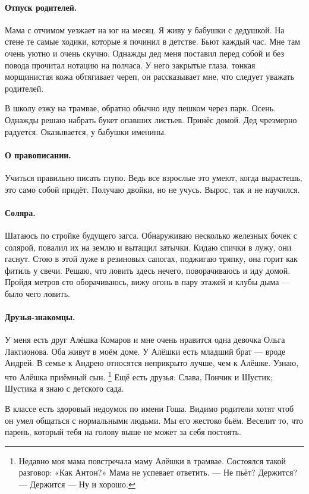 \documentclass{book}
\begin{document}
\paragraph{Отпуск родителей.} 
Мама с отчимом уезжает на юг на месяц.
Я живу у бабушки с дедушкой.
На стене те самые ходики, которые я починил в детстве.
Бьют каждый час.
Мне там очень уютно и очень скучно.
Однажды дед меня поставил перед собой и без повода прочитал нотацию на полчаса.
У него закрытые глаза,
тонкая морщинистая кожа обтягивает череп, 
он рассказывает мне, что следует уважать родителей.

В школу езжу на трамвае, обратно обычно иду пешком через парк.
Осень.
Однажды решаю набрать букет опавших листьев.
Принёс домой. 
Дед чрезмерно радуется. 
Оказывается, у бабушки именины.

\paragraph{О правописании.}
Учиться правильно писать глупо. 
Ведь все взрослые это умеют,
когда вырастешь, это само собой придёт.
Получаю двойки, но не учусь. 
Вырос, так и не научился.

\paragraph{Соляра.}
Шатаюсь по стройке будущего загса.
Обнаруживаю несколько железных бочек с солярой,
повалил их на землю и вытащил затычки.
Кидаю спички в лужу, они гаснут.
Стою в этой луже в резиновых сапогах,
поджигаю тряпку, она горит как фитиль у свечи.
Решаю, что ловить здесь нечего, поворачиваюсь и иду домой.
Пройдя метров сто оборачиваюсь, вижу огонь в пару этажей и клубы дыма --- было чего ловить.

\paragraph{Друзья-знакомцы.}
У меня есть друг Алёшка Комаров
и мне очень нравится одна девочка Ольга Лактионова.
Оба живут в моём доме.
У Алёшки есть младший брат --- вроде Андрей.
В семье к Андрею относятся неприкрыто лучше, чем к Алёшке.
Узнаю, что Алёшка приёмный сын.%
\footnote{Недавно моя мама повстречала маму Алёшки в трамвае. Состоялся такой разговор: «Как Антон?» Мама не успевает ответить. --- Не пьёт? Держится? --- Держится --- Ну и хорошо.}
Ещё есть друзья: Слава, Пончик и Шустик;
Шустика я знаю с детского сада.

В классе есть здоровый недоумок по имени Гоша.
Видимо родители хотят чтоб он умел общаться с нормальными людьми.
Мы его жестоко бьём.
Веселит то, что парень, который тебя на голову выше не может за себя постоять.
\end{document}
